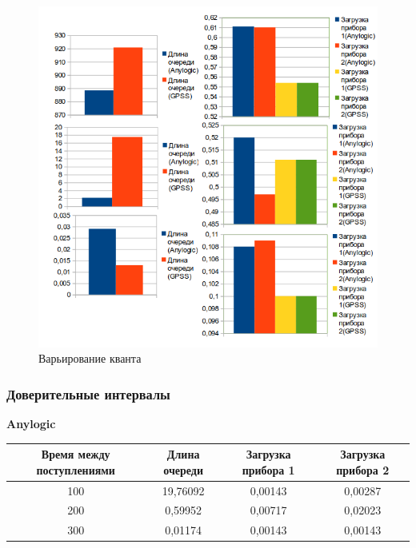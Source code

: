 \begin{figure}
\centering
\includegraphics[resolution=96]{img/quantum.png}
\caption{Варьирование кванта} \end{figure}

\subsubsection{Доверительные интервалы}

\textbf{Anylogic}

\begin{adjustbox}{max width=\textwidth}
\begin{tabular}{|c|c|c|c|}
\hline
Время между поступлениями & Длина очереди & Загрузка прибора 1 & Загрузка прибора 2 \\ \hline
100 & 19,76092 & 0,00143 & 0,00287 \\ \hline
200 & 0,59952 & 0,00717 & 0,02023 \\ \hline
300 & 0,01174 & 0,00143 & 0,00143 \\ \hline
\end{tabular}
\end{adjustbox}
\newline
\vspace*{1 cm}
\newline

